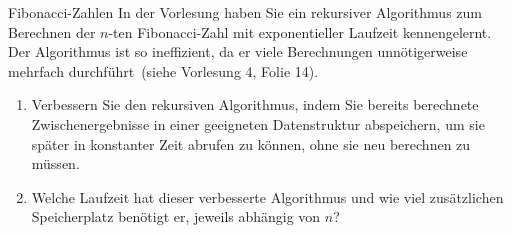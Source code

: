 \documentclass[11pt,a4paper]{article}
\begin{document}
\begin{aufgabe}{3}{Fibonacci-Zahlen}
In der Vorlesung haben Sie ein rekursiver Algorithmus zum Berechnen der $n$-ten Fibonacci-Zahl mit exponentieller Laufzeit kennengelernt.
Der Algorithmus ist so ineffizient, da er viele Berechnungen unnötigerweise mehrfach durchführt~(siehe Vorlesung 4, Folie 14).
\begin{enumerate}
    \item Verbessern Sie den rekursiven Algorithmus, indem Sie bereits berechnete Zwischenergebnisse in einer geeigneten Datenstruktur abspeichern, um sie später in konstanter Zeit abrufen zu können, ohne sie neu berechnen zu müssen.
    \item Welche Laufzeit hat dieser verbesserte Algorithmus und wie viel zusätzlichen Speicherplatz benötigt er, jeweils abhängig von $n$?
\end{enumerate}
\end{aufgabe}
\end{document}

